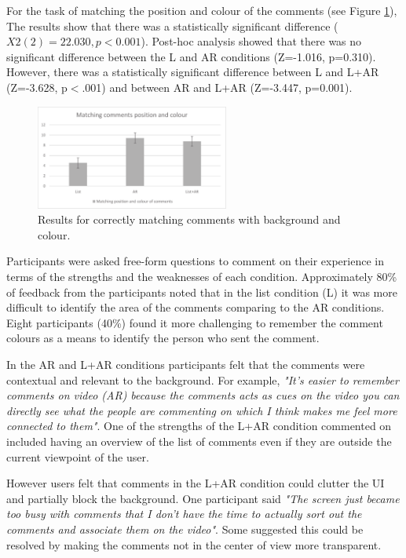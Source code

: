 For the task of matching the position and colour of the comments (see Figure \ref{fig:mgia16:questions_matching}), The results show that there was a statistically significant difference ($X2(2)=22.030, p<0.001$). Post-hoc analysis showed that there was no significant difference between the L and AR conditions (Z=-1.016, p=0.310). However, there was a statistically significant difference between L and L+AR (Z=-3.628, p$<$.001) and between AR and L+AR (Z=-3.447, p=0.001).

\begin{figure}[ht]
  \centering
  \includegraphics[width=2.5in]{images/mgia16/matching.eps}
  \caption{Results for correctly matching comments with background and colour.}
	\label{fig:mgia16:questions_matching}
\end{figure}

Participants were asked free-form questions to comment on their experience in terms of the strengths and the weaknesses of each condition. Approximately 80\% of feedback from the participants noted that in the list condition (L) it was more difficult to identify the area of the comments comparing to the AR conditions. Eight participants (40\%) found it more challenging to remember the comment colours as a means to identify the person who sent the comment. 

In the AR and L+AR conditions participants felt that the comments were contextual and relevant to the background. For example, \textit{"It's easier to remember comments on video (AR) because the comments acts as cues on the video you can directly see what the people are commenting on which I think makes me feel more connected to them"}. One of the strengths of the L+AR condition commented on included having an overview of the list of comments even if they are outside the current viewpoint of the user. 

However users felt that comments in the L+AR condition could clutter the UI and partially block the background. One participant said \textit{"The screen just became too busy with comments that I don't have the time to actually sort out the comments and associate them on the video"}. Some suggested this could be resolved by making the comments not in the center of view more transparent.
 
